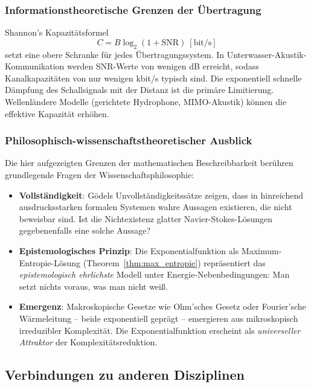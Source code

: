 ﻿\documentclass[12pt,a4paper]{article}
\theoremstyle{definition}
\theoremstyle{remark}
\begin{document}
\subsubsection{Informationstheoretische Grenzen der Übertragung}

Shannon's Kapazitätsformel
\begin{equation}
C = B\log_2\left(1 + \text{SNR}\right)~[\text{bit/s}]
\end{equation}
setzt eine obere Schranke für jedes Übertragungssystem. In Unterwasser-Akustik-Kommu\-nikation werden SNR-Werte von wenigen dB erreicht, sodass Kanalkapazitäten von nur wenigen kbit/s typisch sind. Die exponentiell schnelle Dämpfung des Schallsignals mit der Distanz ist die primäre Limitierung. Wellenländere Modelle (gerichtete Hydrophone, MIMO-Akustik) können die effektive Kapazität erhöhen.

\subsubsection{Philosophisch-wissenschaftstheoretischer Ausblick}

Die hier aufgezeigten Grenzen der mathematischen Beschreibbarkeit berühren grundlegende Fragen der Wissenschaftsphilosophie:

\begin{itemize}
\item \textbf{Vollständigkeit}: Gödels Unvollständigkeitssätze zeigen, dass in hinreichend ausdrucksstarken formalen Systemen wahre Aussagen existieren, die nicht beweisbar sind. Ist die Nichtexistenz glatter Navier-Stokes-Lösungen gegebenenfalls eine solche Aussage?
\item \textbf{Epistemologisches Prinzip}: Die Exponentialfunktion als Maximum-Entropie-Lö\-sung (Theorem~\ref{thm:max_entropie}) repräsentiert das \emph{epistemologisch ehrlichste} Modell unter Ener\-gie-Nebenbedingungen: Man setzt nichts voraus, was man nicht weiß.
\item \textbf{Emergenz}: Makroskopische Gesetze wie Ohm'sches Gesetz oder Fourier'sche Wär\-me\-leitung -- beide exponentiell geprägt -- emergieren aus mikroskopisch irreduzibler Komplexität. Die Exponentialfunktion erscheint als \emph{universeller Attraktor} der Komplexitätsreduktion.
\end{itemize}

\subsection{Verbindungen zu anderen Disziplinen}
\end{document}

